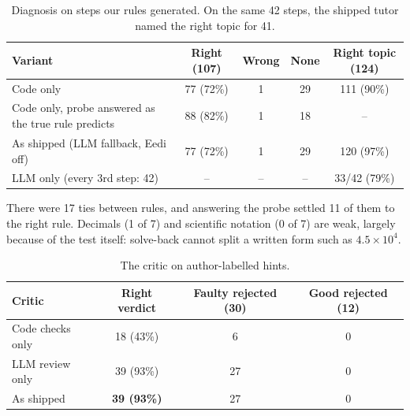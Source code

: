 \documentclass[11pt,a4paper]{article}
\newcommand{\best}[1]{\textbf{#1}}
\begin{document}
\begin{table}[H]
\centering\small
\begin{tabular}{@{}lcccc@{}}
\toprule
Variant & Right (107) & Wrong & None & Right topic (124) \\
\midrule
Code only & 77 (72\%) & 1 & 29 & 111 (90\%) \\
Code only, probe answered as the true rule predicts & 88 (82\%) & 1 & 18 & -- \\
As shipped (LLM fallback, Eedi off) & 77 (72\%) & 1 & 29 & 120 (97\%) \\
LLM only (every 3rd step: 42) & -- & -- & -- & 33/42 (79\%) \\
\bottomrule
\end{tabular}
\caption{Diagnosis on steps our rules generated. On the same 42 steps, the shipped tutor named the right topic for 41.}
\end{table}

There were 17 ties between rules, and answering the probe settled 11 of them to the right rule. Decimals (1 of 7) and scientific notation (0 of 7) are weak, largely because of the test itself: solve-back cannot split a written form such as $4.5 \times 10^4$.
\begin{table}[H]
\centering\small
\begin{tabular}{@{}lccc@{}}
\toprule
Critic & Right verdict & Faulty rejected (30) & Good rejected (12) \\
\midrule
Code checks only & 18 (43\%) & 6 & 0 \\
LLM review only & 39 (93\%) & 27 & 0 \\
\rowcolor{rowgray}As shipped & \best{39 (93\%)} & 27 & 0 \\
\bottomrule
\end{tabular}
\caption{The critic on author-labelled hints.}
\end{table}
\end{document}
